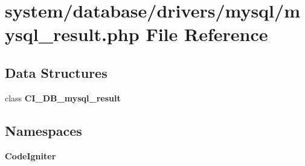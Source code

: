 \section{system/database/drivers/mysql/mysql\-\_\-result.php File Reference}
\label{mysql__result_8php}
\subsection*{Data Structures}
\begin{DoxyCompactItemize}
\item 
class {\bf C\-I\-\_\-\-D\-B\-\_\-mysql\-\_\-result}
\end{DoxyCompactItemize}
\subsection*{Namespaces}
\begin{DoxyCompactItemize}
\item 
{\bf Code\-Igniter}
\end{DoxyCompactItemize}
